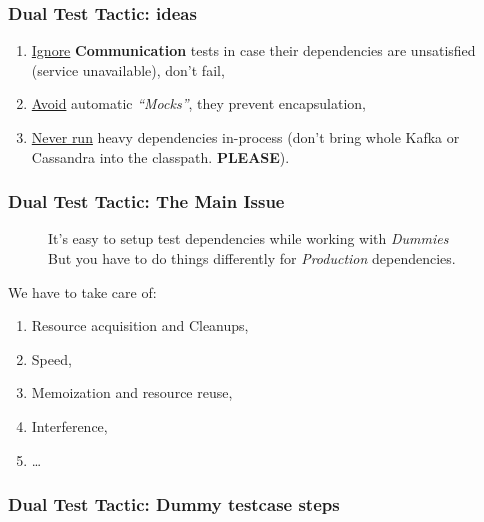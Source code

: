 \documentclass[usenames,dvipsnames]{beamer}
\begin{document}
\begin{frame}
  \frametitle{Dual Test Tactic: ideas}

  \begin{enumerate}
    \item \underline{Ignore} \textbf{Communication} tests in case their dependencies are unsatisfied (service unavailable), don't fail,
    \item \underline{Avoid} automatic \textit{``Mocks''}, they prevent encapsulation,
    \item \underline{Never run} heavy dependencies in-process (don't bring whole Kafka or Cassandra into the classpath. \textbf{PLEASE}).
  \end{enumerate}
\end{frame}

\begin{frame}
  \frametitle{Dual Test Tactic: The Main Issue}

  \begin{figure}
  It's easy to setup test dependencies while working with \textit{Dummies} \\
  But you have to do things differently for \textit{Production} dependencies.
  \end{figure}

  We have to take care of:
  \begin{enumerate}
    \item Resource acquisition and Cleanups,
    \item Speed,
    \item Memoization and resource reuse,
    \item Interference,
    \item \dots
  \end{enumerate}
\end{frame}

\begin{frame}
  \frametitle{Dual Test Tactic: Dummy testcase steps}
  \begin{figure}
   \end{figure}
\end{frame}
\end{document}
